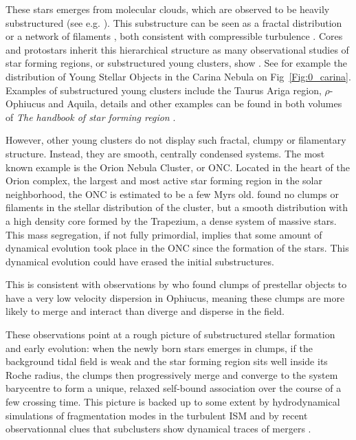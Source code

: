 These stars emerges from molecular clouds, which are observed to be heavily substructured (see e.g. \citealt{Cambresy1999}). This substructure can be seen as a fractal distribution \citep{Elmegreen1996} or a network of filaments \citep{Andre2010}, both consistent with compressible turbulence \citep{McKee2007}. Cores and protostars inherit this hierarchical structure as many observational studies of star forming regions, or substructured young clusters, show \citep{Schneider1979,Hartmann2002,Bressert2010}. See for example the distribution of Young Stellar Objects in the Carina Nebula on Fig~\ref{Fig:0_carina}. Examples of substructured young clusters include the Taurus Ariga region, $\rho$-Ophiucus and Aquila, details and other examples can be found in both volumes of \textit{The handbook of star forming region} \cite{Reipurth2008}.  

However, other young clusters do not display such fractal, clumpy or filamentary structure. Instead, they are smooth, centrally condensed systems. The most known example is the Orion Nebula Cluster, or ONC. Located in the heart of the Orion complex, the largest and most active star forming region in the solar neighborhood, the ONC is estimated to be a few Myrs old. \cite{Hillenbrand1998} found no clumps or filaments in the stellar distribution of the cluster, but a smooth distribution with a high density core formed by the Trapezium, a dense system of massive stars. This mass segregation, if not fully primordial, implies that some amount of dynamical evolution took place in the ONC since the formation of the stars. This dynamical evolution could have erased the initial substructures.

This is consistent with observations by \cite{Andre2007} who found clumps of prestellar objects to have a very low velocity dispersion in Ophiucus, meaning these clumps are more likely to merge and interact than diverge and disperse in the field.

These observations point at a rough picture of substructured stellar formation and early evolution: when the newly born stars emerges in clumps, if the background tidal field is weak and the star forming region sits well inside its Roche radius, the clumps then progressively merge and converge to the system barycentre to form a unique, relaxed  self-bound association over the course of a few crossing time. This picture is backed up to some extent by hydrodynamical simulations of fragmentation modes in the turbulent ISM \citep{Klessen2000,Bate2003,MacLow2004,Offner2009,Maschberger2010} and by recent observationnal clues that subclusters show dynamical traces of mergers \citep{Kuhn2015b}. 


